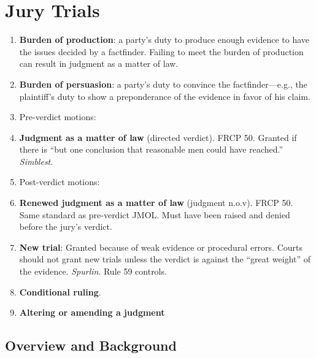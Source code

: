 \section{Jury Trials}

\begin{enumerate}
    \item \textbf{Burden of production}: a party's duty to produce enough 
    evidence to have the issues decided by a factfinder. Failing to meet the 
    burden of production can result in judgment as a matter of law.
    \item \textbf{Burden of persuasion}: a party's duty to convince the 
    factfinder---e.g., the plaintiff's duty to show a preponderance of the 
    evidence in favor of his claim.
    \item Pre-verdict motions:
        \item \textbf{Judgment as a matter of law} (directed verdict). FRCP 
        50. Granted if there is ``but one conclusion that reasonable men could 
        have reached.'' \emph{Simblest}.
    \item Post-verdict motions:
        \item \textbf{Renewed judgment as a matter of law} (judgment n.o.v). 
        FRCP 50. Same standard as pre-verdict JMOL. Must have been raised and 
        denied before the jury's verdict.
        \item \textbf{New trial}: Granted because of weak evidence or 
        procedural errors. Courts should not grant new trials unless the 
        verdict is against the ``great weight'' of the evidence.  
        \emph{Spurlin}. Rule 59 controls.
        \item \textbf{Conditional ruling}.
        \item \textbf{Altering or amending a judgment}
\end{enumerate}

\subsection{Overview and Background}

